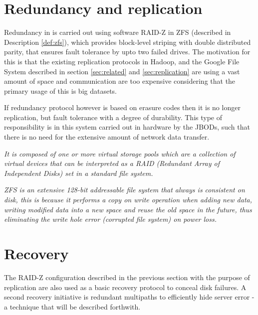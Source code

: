 \section{Redundancy and replication}
Redundancy in \CodeName is carried out using \eg software RAID-Z in ZFS (described in Description \ref{def:zfs}), which provides block-level striping with double distributed parity, that ensures fault tolerance by upto two failed drives. The motivation for this is that the existing replication protocols in \eg Hadoop, and the Google File System described in section \ref{sec:related} and \ref{sec:replication} are using a vast amount of space and communication are too expensive considering that the primary usage of this is big datasets.
\newline

If redundancy protocol however is based on erasure codes then it is no longer replication, but fault tolerance with a degree of durability. This type of responsibility is in this system carried out in hardware by the JBODs, such that there is no need for the extensive amount of network data transfer.
\vspace*{2mm}

\begin{definition}[ZFS] \label{def:zfs}
\textit{It is composed of one or more virtual storage pools which are a collection of virtual devices that can be interpreted as a RAID (Redundant Array of Independent Disks) set in a standard file system.}
\newline

\textit{ZFS is an extensive 128-bit addressable file system that always is consistent on disk, this is because it performs a copy on write operation when adding new data, \ie writing modified data into a new space and reuse the old space in the future, thus eliminating the write hole error (corrupted file system) \eg on power loss.}
\end{definition}
\vspace*{2mm}

\section{Recovery} \label{sec:recovery}
The RAID-Z configuration described in the previous section with the purpose of \eg replication are also used as a basic recovery protocol to conceal disk failures. A second recovery initiative is redundant multipaths to efficiently hide server error - a technique that will be described forthwith.
\newline

